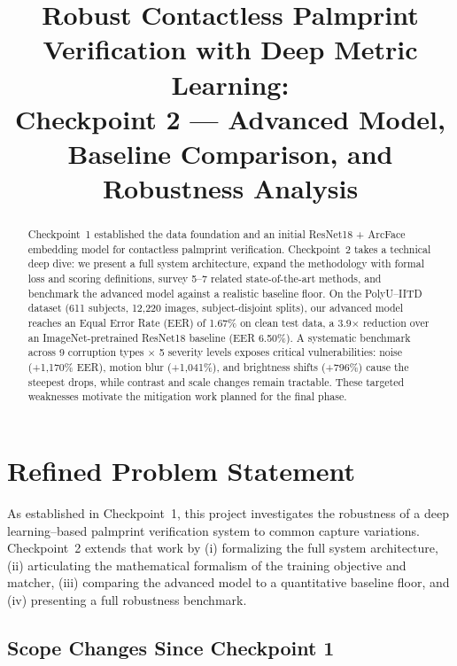 \documentclass[conference]{IEEEtran}
\begin{document}
\title{Robust Contactless Palmprint Verification with Deep Metric Learning:\\Checkpoint 2 --- Advanced Model, Baseline Comparison, and Robustness Analysis}

\author{
}

\maketitle

\begin{abstract}
Checkpoint~1 established the data foundation and an initial ResNet18 + ArcFace embedding model for contactless palmprint verification. Checkpoint~2 takes a technical deep dive: we present a full system architecture, expand the methodology with formal loss and scoring definitions, survey 5--7 related state-of-the-art methods, and benchmark the advanced model against a realistic baseline floor. On the PolyU--IITD dataset (611 subjects, 12{,}220 images, subject-disjoint splits), our advanced model reaches an Equal Error Rate (EER) of 1.67\% on clean test data, a 3.9$\times$ reduction over an ImageNet-pretrained ResNet18 baseline (EER 6.50\%). A systematic benchmark across 9 corruption types $\times$ 5 severity levels exposes critical vulnerabilities: noise (+1{,}170\% EER), motion blur (+1{,}041\%), and brightness shifts (+796\%) cause the steepest drops, while contrast and scale changes remain tractable. These targeted weaknesses motivate the mitigation work planned for the final phase.
\end{abstract}

\section{Refined Problem Statement}

As established in Checkpoint~1, this project investigates the robustness of a deep learning--based palmprint verification system to common capture variations. Checkpoint~2 extends that work by (i) formalizing the full system architecture, (ii) articulating the mathematical formalism of the training objective and matcher, (iii) comparing the advanced model to a quantitative baseline floor, and (iv) presenting a full robustness benchmark.

\subsection{Scope Changes Since Checkpoint 1}
\end{document}

